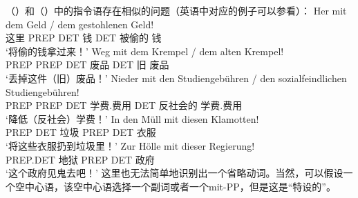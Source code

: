 \begin{exe}
\begin{xlist}[iv.]
\begin{exe}
\begin{xlist}[iv.]
（）和（）中的指令语存在相似的问题（英语中对应的例子可以参看）：
\eal
\label{Beispiel-Direktiva}
\ex 
\gll Her  mit  dem Geld   / dem gestohlenen Geld!\\
     这里 PREP DET 钱 {} DET 被偷的 钱\\
\glt `将偷的钱拿过来！'
\ex 
\gll Weg  mit  dem Krempel / dem alten Krempel!\\
     PREP PREP DET 废品   {} DET 旧 废品\\
\glt `丢掉这件（旧）废品！'
\ex 
\gll Nieder mit den Studiengebühren / den sozialfeindlichen Studiengebühren!\\
     PREP PREP DET 学费.费用  {} DET 反社会的 学费.费用\\
\glt `降低（反社会）学费！'
\zl
\eal
\ex 
\gll In den Müll mit diesen Klamotten!\\
     PREP DET 垃圾 PREP DET 衣服\\
\glt `将这些衣服扔到垃圾里！'
\ex 
\gll Zur Hölle mit dieser Regierung!\\
	 PREP.DET 地狱 PREP DET 政府\\
\glt `这个政府见鬼去吧！'
\zl
这里也无法简单地识别出一个省略动词。当然，可以假设一个空中心语，该空中心语选择一个副词或者一个mit-PP，但是这是“特设的”。

\end{xlist}
\end{exe}
\end{xlist}
\end{exe}
